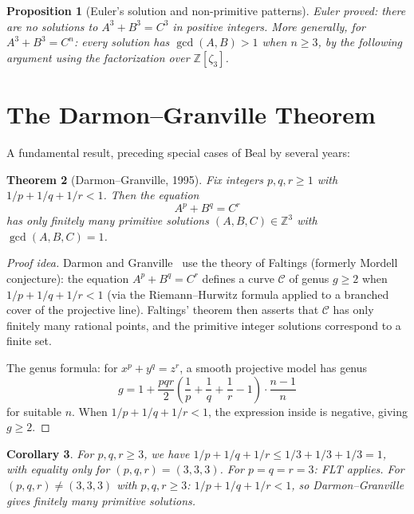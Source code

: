 \documentclass[12pt,a4paper]{amsart}
\newtheorem{theorem}{Theorem}[section]
\newtheorem{corollary}[theorem]{Corollary}
\newtheorem{proposition}[theorem]{Proposition}
\theoremstyle{definition}
\theoremstyle{remark}
\begin{document}
\begin{proposition}[Euler's solution and non-primitive patterns]
Euler proved: there are no solutions to $A^3 + B^3 = C^3$ in positive integers.
More generally, for $A^3 + B^3 = C^n$: every solution has $\gcd(A,B) > 1$ when
$n \geq 3$, by the following argument using the factorization over $\mathbb{Z}[\zeta_3]$.
\end{proposition}

\section{The Darmon--Granville Theorem}

A fundamental result, preceding special cases of Beal by several years:

\begin{theorem}[Darmon--Granville, 1995]\label{thm:DG}
Fix integers $p, q, r \geq 1$ with $1/p + 1/q + 1/r < 1$. Then the equation
\[
  A^p + B^q = C^r
\]
has only finitely many primitive solutions $(A, B, C) \in \mathbb{Z}^3$ with
$\gcd(A, B, C) = 1$.
\end{theorem}

\begin{proof}[Proof idea]
Darmon and Granville~\cite{DG95} use the theory of Faltings (formerly Mordell
conjecture): the equation $A^p + B^q = C^r$ defines a curve $\mathcal{C}$ of
genus $g \geq 2$ when $1/p + 1/q + 1/r < 1$ (via the Riemann--Hurwitz formula
applied to a branched cover of the projective line). Faltings' theorem then
asserts that $\mathcal{C}$ has only finitely many rational points, and the
primitive integer solutions correspond to a finite set.

The genus formula: for $x^p + y^q = z^r$, a smooth projective model has genus
\[
  g = 1 + \frac{pqr}{2}\left(\frac{1}{p} + \frac{1}{q} + \frac{1}{r} - 1\right)
      \cdot \frac{n-1}{n}
\]
for suitable $n$. When $1/p + 1/q + 1/r < 1$, the expression inside is negative,
giving $g \geq 2$.
\end{proof}

\begin{corollary}
For $p, q, r \geq 3$, we have $1/p + 1/q + 1/r \leq 1/3 + 1/3 + 1/3 = 1$,
with equality only for $(p,q,r) = (3,3,3)$. For $p = q = r = 3$: FLT applies.
For $(p,q,r) \neq (3,3,3)$ with $p,q,r \geq 3$: $1/p+1/q+1/r < 1$, so
Darmon--Granville gives finitely many primitive solutions.
\end{corollary}
\end{document}
